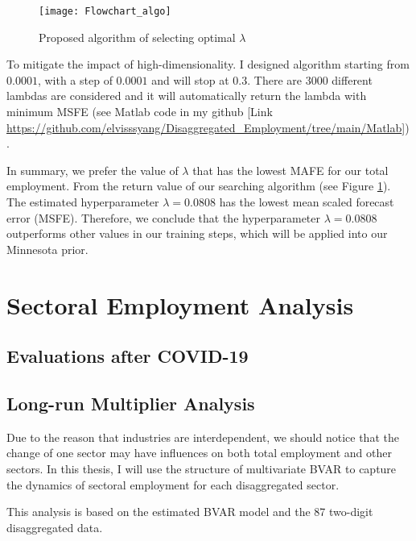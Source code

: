 \documentclass{monashthesis}
\begin{document}
\begin{figure}[ht]
\texttt{[image: Flowchart\_algo]}
\centering
\caption{Proposed algorithm of selecting optimal $\lambda$}
\label{fig:sealgo}
\end{figure}

To mitigate the impact of high-dimensionality. I designed algorithm starting from \(0.0001\), with a step of \(0.0001\) and will stop at \(0.3\). There are 3000 different lambdas are considered and it will automatically return the lambda with minimum MSFE (see Matlab code in my github {[}Link \url{https://github.com/elvisssyang/Disaggregated_Employment/tree/main/Matlab}{]}).

In summary, we prefer the value of \(\lambda\) that has the lowest MAFE for our total employment. From the return value of our searching algorithm (see Figure \ref{fig:sealgo}). The estimated hyperparameter \(\lambda=0.0808\) has the lowest mean scaled forecast error (MSFE). Therefore, we conclude that the hyperparameter \(\lambda=0.0808\) outperforms other values in our training steps, which will be applied into our Minnesota prior.

\newpage

\hypertarget{sectoral-employment-analysis}{%
\chapter{Sectoral Employment Analysis}\label{sectoral-employment-analysis}}

\hypertarget{evaluations-after-covid-19}{%
\section{Evaluations after COVID-19}\label{evaluations-after-covid-19}}

\hypertarget{long-run-multiplier-analysis}{%
\section{Long-run Multiplier Analysis}\label{long-run-multiplier-analysis}}

Due to the reason that industries are interdependent, we should notice that the change of one sector may have influences on both total employment and other sectors. In this thesis, I will use the structure of multivariate BVAR to capture the dynamics of sectoral employment for each disaggregated sector.

This analysis is based on the estimated BVAR model and the 87 two-digit disaggregated data.
\end{document}
